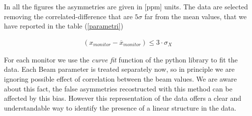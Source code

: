 In all the figures the asymmetries are given in [ppm] units. The data are selected removing the correlated-difference that are $5\sigma$ far from the mean values, that we have reported in the table (\ref{parametri}) 

\begin{align*}
(x_{monitor} - \overline{x}_{monitor}) \leq 3 \cdot \sigma_{X}
\end{align*}

For each monitor we use the \textit{curve fit} function of the python library  to fit the data. Each Beam parameter is treated separately now, so in principle we are ignoring possible effect of correlation between the beam values. We are aware about this fact, the false asymmetries recostructed with this method can be affected by this bias. However this representation of the data offers a clear and understandable way to identify the presence of a linear structure in the data.

